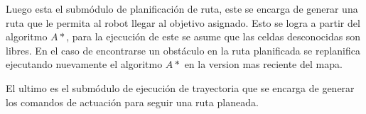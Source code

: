 Luego esta el submódulo de planificación de ruta, este se encarga de generar una ruta que le permita al robot llegar al objetivo asignado. Esto se logra a partir del algoritmo $A*$, para la ejecución de este se asume que las celdas desconocidas son libres. En el caso de encontrarse un obstáculo en la ruta planificada se replanifica ejecutando nuevamente el algoritmo $A*$ en la version mas reciente del mapa.

El ultimo es el submódulo de ejecución de trayectoria que se encarga de generar los comandos de actuación para seguir una ruta planeada.







